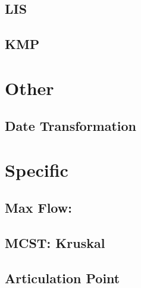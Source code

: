 \documentclass[8pt , a4paper]{report}
\begin{document}
\subsection{LIS}


\subsection{KMP}


\section{Other}

\subsection{Date Transformation}



\section{Specific}
\subsection{Max Flow: }

\pagebreak
\subsection{MCST: Kruskal}

\pagebreak
\subsection{Articulation Point}

\end{document}
